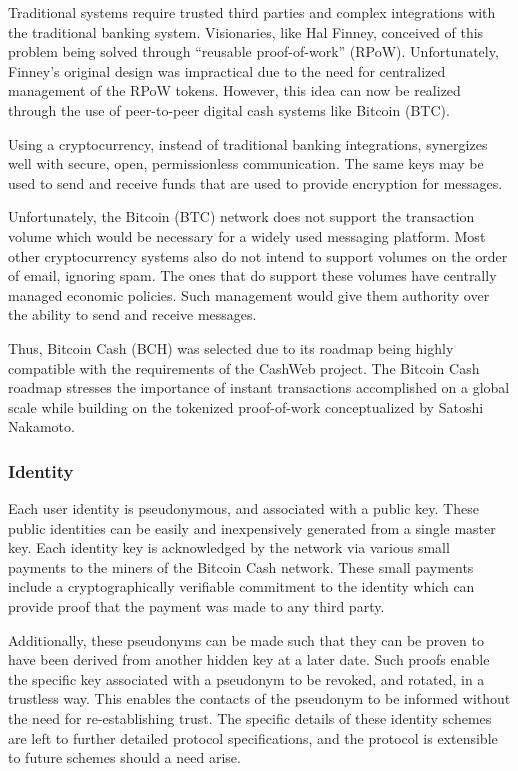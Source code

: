 \documentclass{article}
\begin{document}
Traditional systems require trusted third parties and complex integrations with the traditional banking system. Visionaries, like Hal Finney, conceived of this problem being solved through ``reusable proof-of-work'' (RPoW). Unfortunately, Finney's original design was impractical due to the need for centralized management of the RPoW tokens. However, this idea can now be realized through the use of peer-to-peer digital cash systems like Bitcoin (BTC).

Using a cryptocurrency, instead of traditional banking integrations, synergizes well with secure, open, permissionless communication. The same keys may be used to send and receive funds that are used to provide encryption for messages.

Unfortunately, the Bitcoin (BTC) network does not support the transaction volume which would be necessary for a widely used messaging platform. Most other cryptocurrency systems also do not intend to support volumes on the order of email, ignoring spam. The ones that do support these volumes have centrally managed economic policies. Such management would give them authority over the ability to send and receive messages.

Thus, Bitcoin Cash (BCH) was selected due to its roadmap being highly compatible with the requirements of the CashWeb project. The Bitcoin Cash roadmap stresses the importance of instant transactions accomplished on a global scale while building on the tokenized proof-of-work conceptualized by Satoshi Nakamoto.

\subsubsection{Identity}

Each user identity is pseudonymous, and associated with a public key. These public identities can be easily and inexpensively generated from a single master key. Each identity key is acknowledged by the network via various small payments to the miners of the Bitcoin Cash network. These small payments include a cryptographically verifiable commitment to the identity which can provide proof that the payment was made to any third party.

Additionally, these pseudonyms can be made such that they can be proven to have been derived from another hidden key at a later date. Such proofs enable the specific key associated with a pseudonym to be revoked, and rotated, in a trustless way. This enables the contacts of the pseudonym to be informed without the need for re-establishing trust. The specific details of these identity schemes are left to further detailed protocol specifications, and the protocol is extensible to future schemes should a need arise.
\end{document}
